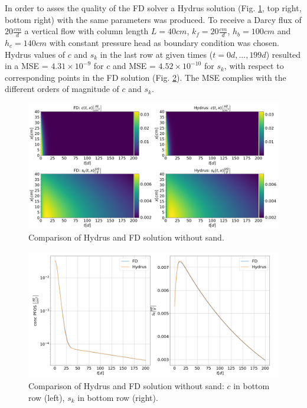 In order to asses the quality of the FD solver a Hydrus solution (Fig. \ref{fig:sol_ov_hyd_fd}, top right, bottom right) with the same parameters was produced. To receive a Darcy flux of $20\frac{cm}{d}$ a vertical flow with column length $L=40cm$, $k_f = 20\frac{cm}{d}$, $h_b = 100cm$ and $h_c = 140cm$ with constant pressure head as boundary condition was chosen.\\
Hydrus values of $c$ and $s_k$ in the last row at given times ($t=0d, ..., 199d$) resulted in a MSE = $4.31 \times 10^{-9}$ for $c$ and MSE = $4.52 \times 10^{-10}$ for $s_k$, with respect to corresponding points in the FD solution (Fig. \ref{fig:hyd_fd_btc}). The MSE complies with the different orders of magnitude of $c$ and $s_k$.
\begin{figure}[h!]
	\centering
	\includegraphics[scale=0.3]{images/sol_ov_hyd_fd.png}
\caption{Comparison of Hydrus and FD solution without sand.}
\label{fig:sol_ov_hyd_fd}
\end{figure}
\begin{figure}[h!]
	\centering
	\includegraphics[width=\textwidth]{images/hyd_fd_last_cell.png}
\caption[Comparison of Hydrus and BTC without sand]{Comparison of Hydrus and FD solution without sand: $c$ in bottom row (left), $s_k$ in bottom row (right).}
\label{fig:hyd_fd_btc}
\end{figure}\\
